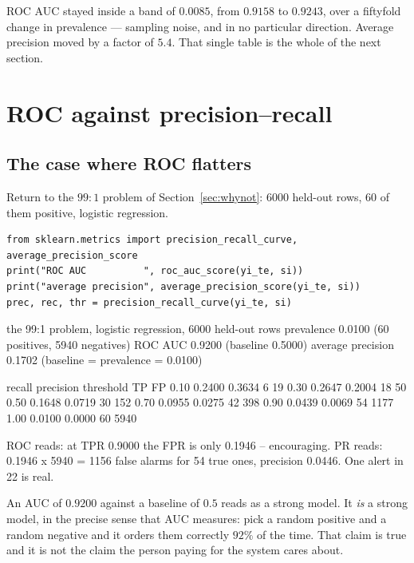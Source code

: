 \documentclass[11pt]{article}
\begin{document}
ROC AUC stayed inside a band of $0.0085$, from $0.9158$ to $0.9243$, over a
fiftyfold change in prevalence --- sampling noise, and in no particular
direction. Average precision moved by a factor of $5.4$. That single table is the
whole of the next section.

\section{ROC against precision--recall}
\label{sec:rocpr}

\subsection{The case where ROC flatters}

Return to the $99\!:\!1$ problem of Section~\ref{sec:whynot}: $6000$ held-out
rows, $60$ of them positive, logistic regression.

\begin{lstlisting}
from sklearn.metrics import precision_recall_curve, average_precision_score
print("ROC AUC          ", roc_auc_score(yi_te, si))
print("average precision", average_precision_score(yi_te, si))
prec, rec, thr = precision_recall_curve(yi_te, si)
\end{lstlisting}
\begin{codeout}
the 99:1 problem, logistic regression, 6000 held-out rows
  prevalence            0.0100  (60 positives, 5940 negatives)
  ROC AUC               0.9200   (baseline 0.5000)
  average precision     0.1702   (baseline = prevalence = 0.0100)

  recall   precision   threshold    TP    FP
   0.10      0.2400      0.3634       6    19
   0.30      0.2647      0.2004      18    50
   0.50      0.1648      0.0719      30   152
   0.70      0.0955      0.0275      42   398
   0.90      0.0439      0.0069      54  1177
   1.00      0.0100      0.0000      60  5940

  ROC reads: at TPR 0.9000 the FPR is only 0.1946 -- encouraging.
  PR reads:  0.1946 x 5940 = 1156 false alarms for 54 true ones,
             precision 0.0446. One alert in 22 is real.
\end{codeout}

An AUC of $0.9200$ against a baseline of $0.5$ reads as a strong model. It
\emph{is} a strong model, in the precise sense that AUC measures: pick a random
positive and a random negative and it orders them correctly $92\%$ of the time.
That claim is true and it is not the claim the person paying for the system
cares about.
\end{document}
